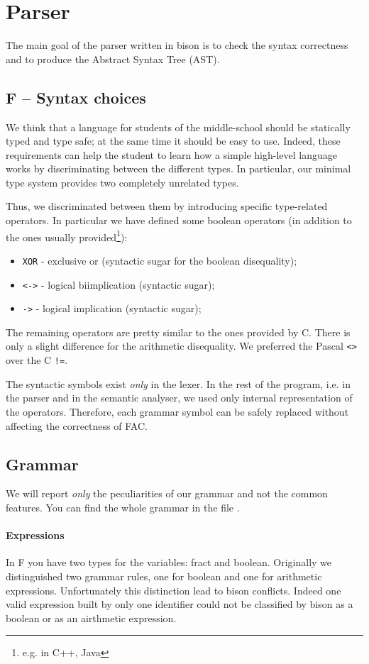 \section{Parser}
\label{sec:parser}
The main goal of the parser written in bison is to check the
syntax correctness and to produce the Abstract Syntax Tree (AST).

\subsection{F -- Syntax choices}
We think that a language for students of the middle-school should be
statically typed and type safe; at the same time it should be easy to use.
Indeed, these requirements can help the student to learn how a simple
high-level language works by discriminating between the different types.
In particular, our minimal type system provides two completely unrelated types.


Thus, we discriminated between them by introducing specific type-related
operators. In particular we have defined some boolean operators
(in addition to the ones usually provided\footnote{e.g. in C++, Java}):
\begin{itemize}
	\item \verb|XOR| - exclusive or (syntactic sugar for the boolean disequality);
	\item \verb|<->| - logical biimplication (syntactic sugar);
	\item \verb|->| - logical implication (syntactic sugar);
\end{itemize}

The remaining operators are pretty similar to the ones provided by C.
There is only a slight difference for the arithmetic disequality.
We preferred the Pascal \verb|<>| over the C \verb|!=|.

The syntactic symbols exist \emph{only} in the lexer. In the
rest of the program, i.e. in the parser and in the semantic analyser, we used
only internal representation of the operators. Therefore, each grammar
symbol can be safely replaced without affecting the correctness of FAC.

\subsection{Grammar}
We will report \emph{only} the peculiarities of our grammar and not the common
features. You can find the whole grammar
in the file .

\paragraph{Expressions}
In F you have two types for the variables: fract and boolean.
Originally we distinguished two grammar rules, one for boolean and
one for arithmetic expressions. Unfortunately this distinction
lead to bison conflicts.
Indeed one valid expression built by only one identifier could not be
classified by bison as a boolean or as an airthmetic expression.


